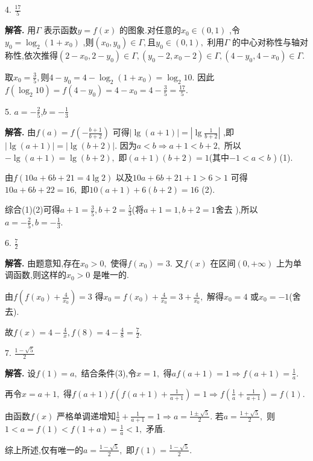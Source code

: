 \documentclass[12pt,a4paper,oneside]{ctexart}
\newenvironment{solution}{\par\noindent\textbf{解答. }}{\\\par}
\begin{document}
4. $ \frac{17}{5} $ 

\begin{solution}
    用$ \Gamma $ 表示函数$ y=f(x) $ 的图象.对任意的$ x_0\in(0,1) $ ,令$ y_0=\log_2(1+x_0) $ ,则$ (x_0,y_0)\in\Gamma, $且$ y_0\in(0,1), $ 利用$ \Gamma $ 的中心对称性与轴对称性,依次推得$ (2-x_0,2-y_0)\in\Gamma,(y_0-2,x_0-2)\in\Gamma,(4-y_0,4-x_0)\in\Gamma. $ 

    取$ x_0=\frac{3}{5}, $则$ 4-y_0=4-\log_2(1+x_0)=\log_2 10. $ 因此$ f(\log_2 10)=f(4-y_0)=4-x_0=4-\frac{3}{5}=\frac{17}{5} $.
\end{solution}

5. $ a=-\frac{2}{5} $,$ b=-\frac{1}{3} $

\begin{solution}
    由$ f(a)=f(-\frac{b+1}{b+2}) $ 可得$ |\lg(a+1)|=|\lg\frac{1}{b+2}| $ ,即$ |\lg(a+1)|=|\lg(b+2)|. $ 因为$ a<b\Rightarrow a+1<b+2, $ 所以$ -\lg(a+1)=\lg(b+2), $ 即$ (a+1)(b+2)=1 $(其中$ -1<a<b $ ) (1).

    由$ f(10a+6b+21=4\lg 2) $ 以及$ 10a+6b+21+1>6>1 $ 可得$ 10a+6b+22=16, $ 即$ 10(a+1)+6(b+2)=16 $ (2).

    综合(1)(2)可得$ a+1=\frac{3}{5},b+2=\frac{5}{3} $(将$ a+1=1,b+2=1 $舍去 ),所以$ a=-\frac{2}{5},b=-\frac{1}{3}. $ 
\end{solution}

6. $ \frac{7}{2} $

\begin{solution}
    由题意知,存在$ x_0>0, $ 使得$ f(x_0)=3. $ 又$ f(x) $ 在区间$ (0,+\infty) $ 上为单调函数,则这样的$ x_0>0 $ 是唯一的.
    
    由$ f(f(x_0)+\frac{4}{x_0})=3 $ 得$ x_0=f(x_0)+\frac{4}{x_0}=3+\frac{4}{x_0}, $ 解得$ x_0=4 $ 或$ x_0=-1 $(舍去).
    
    故$ f(x)=4-\frac{4}{x},f(8)=4-\frac{4}{8}=\frac{7}{2}. $ 
\end{solution}

7. $ \frac{1-\sqrt{5}}{2} $ 

\begin{solution}
    设$ f(1)=a, $ 结合条件(3),令$ x=1, $ 得$ af(a+1)=1\Rightarrow f(a+1)=\frac{1}{a}. $ 
    
    再令$ x=a+1, $ 得$ f(a+1)f(f(a+1)+\frac{1}{a+1})=1\Rightarrow f(\frac{1}{a}+\frac{1}{a+1})=f(1). $ 
    
    由函数$ f(x) $ 严格单调递增知$ \frac{1}{a}+\frac{1}{a+1}=1\Rightarrow a=\frac{1\pm\sqrt{5}}{2}. $ 若$ a=\frac{1+\sqrt{5}}{2}, $ 则$ 1<a=f(1)<f(1+a)=\frac{1}{a}<1, $ 矛盾.
    
    综上所述,仅有唯一的$ a=\frac{1-\sqrt{5}}{2}, $ 即$ f(1)=\frac{1-\sqrt{5}}{2}. $ 
\end{solution}
\end{document}
